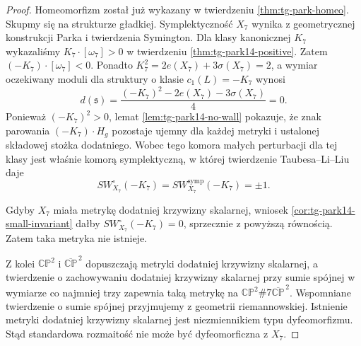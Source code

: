 \documentclass[11pt,a4paper]{report}
\numberwithin{equation}{section}
\theoremstyle{plain}
\theoremstyle{definition}
\theoremstyle{remark}
\begin{document}
\begin{proof}
Homeomorfizm został już wykazany w twierdzeniu
\ref{thm:tg-park-homeo}. Skupmy się na strukturze gładkiej.
Symplektyczność $X_7$ wynika z geometrycznej konstrukcji
Parka i twierdzenia Symington. Dla klasy kanonicznej $K_7$
wykazaliśmy $K_7\cdot[\omega_7]>0$ w twierdzeniu
\ref{thm:tg-park14-positive}. Zatem
$(-K_7)\cdot[\omega_7]<0$.
Ponadto $K_7^2=2e(X_7)+3\sigma(X_7)=2$,
a wymiar oczekiwany moduli dla struktury o klasie
$c_1(L)=-K_7$ wynosi
\[
d(\mathfrak s)=\frac{(-K_7)^2-2e(X_7)-3\sigma(X_7)}4=0.
\]
Ponieważ $(-K_7)^2>0$, lemat
\ref{lem:tg-park14-no-wall} pokazuje, że znak
parowania $(-K_7)\cdot H_g$ pozostaje ujemny dla
każdej metryki i ustalonej składowej stożka dodatniego.
Wobec tego komora małych perturbacji dla tej klasy
jest właśnie komorą symplektyczną, w której twierdzenie
Taubesa--Li--Liu daje
\[
SW_{X_7}^{\circ}(-K_7)
 =SW_{X_7}^{\mathrm{symp}}(-K_7)=\pm1.
\]

Gdyby $X_7$ miała metrykę dodatniej krzywizny skalarnej,
wniosek \ref{cor:tg-park14-small-invariant} dałby
$SW_{X_7}^{\circ}(-K_7)=0$, sprzecznie z powyższą równością.
Zatem taka metryka nie istnieje.

Z kolei $\mathbb{CP}^{2}$ i $\overline{\mathbb{CP}}^{\,2}$
dopuszczają metryki dodatniej krzywizny skalarnej,
a twierdzenie o zachowywaniu dodatniej krzywizny
skalarnej przy sumie spójnej w wymiarze co najmniej trzy
zapewnia taką metrykę na
$\mathbb{CP}^{2}\#7\overline{\mathbb{CP}}^{\,2}$.
Wspomniane twierdzenie o sumie spójnej przyjmujemy z
geometrii riemannowskiej. Istnienie metryki dodatniej
krzywizny skalarnej jest niezmiennikiem typu dyfeomorfizmu.
Stąd standardowa rozmaitość nie może być dyfeomorficzna
z $X_7$.
\end{proof}

\begin{center}
\end{center}
\end{document}
